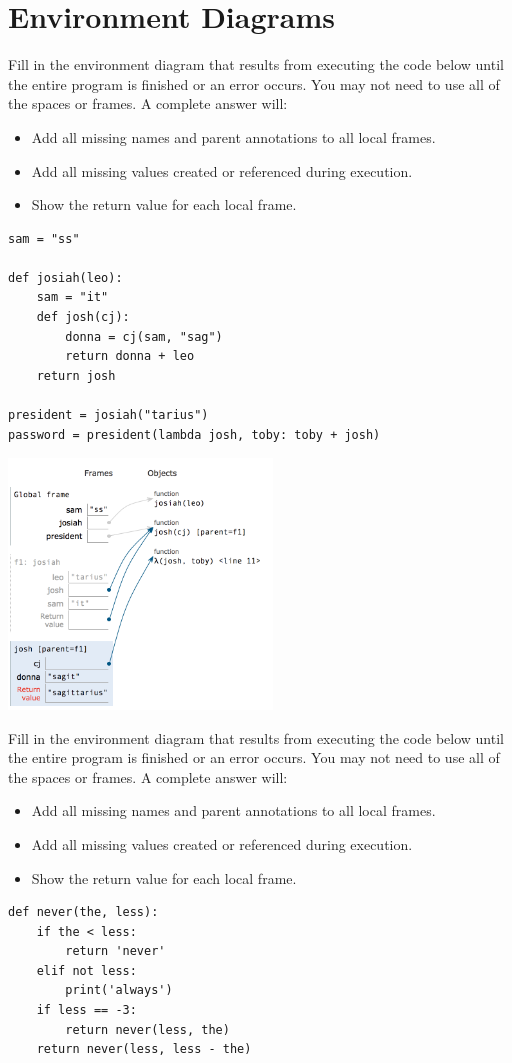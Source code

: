 \documentclass{exam}
\begin{document}
\section{Environment Diagrams}
\begin{questions}
\item Fill in the environment diagram that results from executing the code below until the entire program
is finished or an error occurs. You may not need to use all of the spaces or frames.
A complete answer will:
\begin{itemize}
\item  Add all missing names and parent annotations to all local frames.
\item  Add all missing values created or referenced during execution.
\item Show the return value for each local frame. 
\end{itemize}
\vspace{1 cm}
\begin{lstlisting}
sam = "ss"

def josiah(leo):
    sam = "it"
    def josh(cj):
        donna = cj(sam, "sag") 
        return donna + leo
    return josh

president = josiah("tarius")
password = president(lambda josh, toby: toby + josh)
\end{lstlisting}


\begin{solution}
\includegraphics[width=7cm]{env1}
\end{solution}

\clearpage

\item Fill in the environment diagram that results from executing the code below until the entire program
is finished or an error occurs. You may not need to use all of the spaces or frames.
A complete answer will:
\begin{itemize}
\item  Add all missing names and parent annotations to all local frames.
\item  Add all missing values created or referenced during execution.
\item Show the return value for each local frame. 
\end{itemize}
\vspace{1 cm}
\begin{lstlisting}
def never(the, less):
    if the < less:
        return 'never'
    elif not less:
        print('always')
    if less == -3:
        return never(less, the)
    return never(less, less - the)


\end{lstlisting}
\end{questions}
\end{document}
